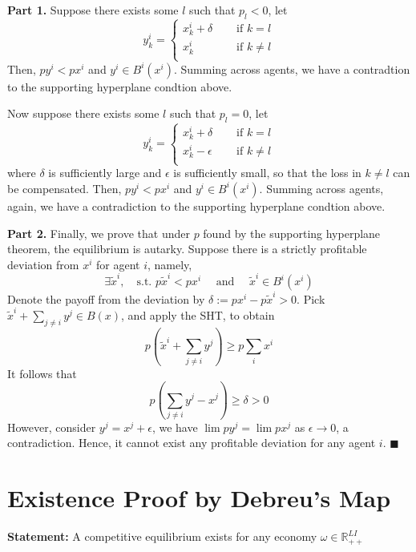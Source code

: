 \noindent \textbf{Part 1.}
Suppose there exists some $l$ such that $p_l < 0$, 
let 
\[
y_k^i = \begin{cases}
    x_k^i + \delta  \quad &\text{ if } k = l \\
    x_k^i \quad & \text{ if } k \neq l \\
\end{cases}
\]
Then, $p y^i < p x^i$ and $y^i \in B^i(x^i)$. 
Summing across agents, we have a contradtion to the supporting hyperplane condtion above.


Now suppose there exists some $l$ such that $p_l = 0$, 
let 
\[
y_k^i = \begin{cases}
    x_k^i + \delta  \quad &\text{ if } k = l \\
    x_k^i - \epsilon \quad & \text{ if } k \neq l \\
\end{cases}
\]
where $\delta$ is sufficiently large and $\epsilon$ is sufficiently small, 
so that the loss in $k \neq l$ can be compensated. 
Then, $p y^i < p x^i$ and $y^i \in B^i(x^i)$. 
Summing across agents, again, we have a contradiction to the supporting hyperplane condtion above.


\noindent \textbf{Part 2.} 
Finally, we prove that under $p$ found by the supporting hyperplane theorem, 
the equilibrium is autarky.
Suppose there is a strictly profitable deviation from $x^i$ for agent $i$,
namely, 
\[
\exists \tilde{x}^i, \quad \text{s.t. } p \tilde{x}^i < p x^i \quad \text{ and } \quad 
\tilde{x}^i \in B^i(x^i)
\]
Denote the payoff from the deviation by $\delta := p x^i - p \tilde{x}^i > 0$.
Pick $\tilde{x}^i + \sum_{j \neq i } y^j \in B(x)$, and apply the SHT, to obtain
\[
p \left(\tilde{x}^i + \sum_{j \neq i } y^j \right) \geq p \sum_i x^i 
\] 
It follows that 
\[
p \left(  \sum_{j \neq i } y^j  - x^j \right) \geq \delta > 0 
\]
However, consider $y^j = x^j + \epsilon$, 
we have 
$\lim p y^j = \lim p x^j$ as $\epsilon \rightarrow 0$,
a contradiction. 
Hence, it cannot exist any profitable deviation for any agent $i$. 
\(\blacksquare\)


\section{Existence Proof by Debreu's Map}
\noindent \textbf{Statement:} A competitive equilibrium exists for any economy $\omega \in \mathbb{R}_{++}^{LI}$ \\


